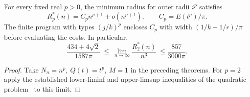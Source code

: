 \begin{corollary}\label{cor:profile-powers}
For every fixed real \(p>0\), the minimum radius for outer radii \(i^p\)
satisfies
\[
 R_p^*(n)= C_p n^{p+1}+o(n^{p+1}),\qquad C_p=E(t^p)/\pi .
\]
The finite program with types \((j/k)^p\) encloses \(C_p\) with width
\((1/k+1/r)/\pi\) before evaluating the costs. In particular,
\[
 \frac{434+4\sqrt2}{1587\pi}\ \le\
 \lim_{n\to\infty}\frac{R_2^*(n)}{n^3}\
 \le\frac{857}{3000\pi}.
\]
\end{corollary}
\begin{proof}
Take \(N_n=n^p,\ Q(t)=t^p,\ M=1\) in the preceding theorems.
For \(p=2\) apply the established lower-liminf and upper-limsup
inequalities of the quadratic problem~\cite{sqprofile} to this limit.
\end{proof}
